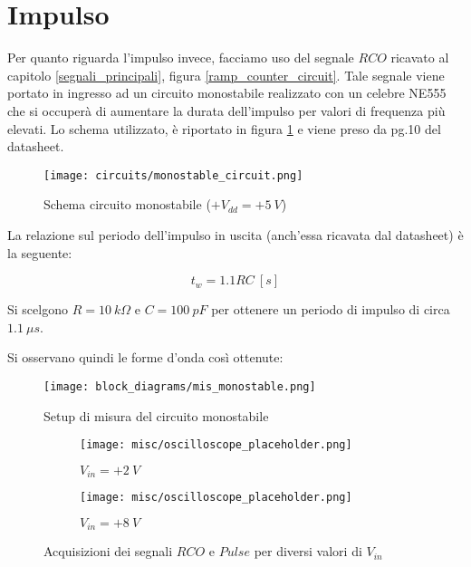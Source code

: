
\section{Impulso}


Per quanto riguarda l'impulso invece, facciamo uso del segnale $RCO$ ricavato al capitolo
\ref{segnali_principali}, figura \ref{ramp_counter_circuit}. Tale segnale viene portato in
ingresso ad un circuito monostabile realizzato con un celebre NE555 \cite{ne555} che si
occuperà di aumentare la durata dell'impulso per valori di frequenza più elevati. Lo schema
utilizzato, è riportato in figura \ref{monostable_circuit} e viene preso da pg.10 del
datasheet.

\begin{figure}[H]
    \centering
    \texttt{[image: circuits/monostable\_circuit.png]}
    \caption{Schema circuito monostabile ($+V_{dd}=+5\ V$)}
    \label{monostable_circuit}
\end{figure}

La relazione sul periodo dell'impulso in uscita (anch'essa ricavata dal datasheet) è la
seguente:

\begin{equation}
    t_w=1.1RC\ [s]
\end{equation}

Si scelgono $R=10\ k\Omega$ e $C=100\ pF$ per ottenere un periodo di impulso di circa
$1.1\ \mu s$.

Si osservano quindi le forme d'onda così ottenute:

\begin{figure}[H]
    \centering
    \texttt{[image: block\_diagrams/mis\_monostable.png]}
    \caption{Setup di misura del circuito monostabile}
    \label{mis_monostable}
\end{figure}

\begin{figure}[H]
    \centering

    \begin{subfigure}{.5\textwidth}
        \centering
        \texttt{[image: misc/oscilloscope\_placeholder.png]}
        \caption{$V_{in}=+2\ V$}
        \label{acq_monostable_2V}
    \end{subfigure}%
    \begin{subfigure}{.5\textwidth}
        \centering
        \texttt{[image: misc/oscilloscope\_placeholder.png]}
        \caption{$V_{in}=+8\ V$}
        \label{acq_monostable_8V}
    \end{subfigure}

    \caption{Acquisizioni dei segnali $RCO$ e $Pulse$ per diversi valori di $V_{in}$}
    \label{mis_pulse}
\end{figure}

